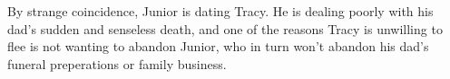 \documentclass{motw}
\begin{document}
By strange coincidence, Junior is dating Tracy.  He is dealing poorly with his dad's sudden and senseless death, and one of the reasons Tracy is unwilling to flee is not wanting to abandon Junior, who in turn won't abandon his dad's funeral preperations or family business.



\makeImageCredits[cc-by-nc-sa]

\end{document}
